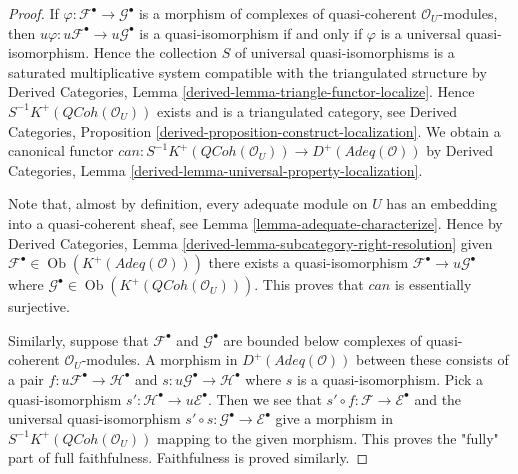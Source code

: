 \documentclass{stacks-project}
\theoremstyle{plain}
\theoremstyle{definition}
\theoremstyle{remark}
\numberwithin{equation}{subsection}
\def\Ob{\mathop{\mathrm{Ob}}\nolimits}
\def\QCoh{\mathit{QCoh}}
\begin{document}
\begin{proof}
If $\varphi : \mathcal{F}^\bullet \to \mathcal{G}^\bullet$
is a morphism of complexes of quasi-coherent
$\mathcal{O}_U$-modules, then $u\varphi : u\mathcal{F}^\bullet \to
u\mathcal{G}^\bullet$ is a quasi-isomorphism if and only if $\varphi$ is
a universal quasi-isomorphism. Hence the collection $S$
of universal quasi-isomorphisms is a saturated multiplicative
system compatible with the triangulated structure by
Derived Categories, Lemma \ref{derived-lemma-triangle-functor-localize}.
Hence $S^{-1}K^+(\QCoh(\mathcal{O}_U))$ exists and is a
triangulated category, see
Derived Categories, Proposition
\ref{derived-proposition-construct-localization}.
We obtain a canonical functor
$can : S^{-1}K^+(\QCoh(\mathcal{O}_U)) \to
D^{+}(\textit{Adeq}(\mathcal{O}))$ by
Derived Categories, Lemma \ref{derived-lemma-universal-property-localization}.

\medskip\noindent
Note that, almost by definition, every adequate module on $U$ has an
embedding into a quasi-coherent sheaf, see
Lemma \ref{lemma-adequate-characterize}. Hence by
Derived Categories, Lemma \ref{derived-lemma-subcategory-right-resolution}
given $\mathcal{F}^\bullet \in \Ob(K^+(\textit{Adeq}(\mathcal{O})))$
there exists a quasi-isomorphism
$\mathcal{F}^\bullet \to u\mathcal{G}^\bullet$
where $\mathcal{G}^\bullet \in \Ob(K^+(\QCoh(\mathcal{O}_U)))$.
This proves that $can$ is essentially surjective.

\medskip\noindent
Similarly, suppose that $\mathcal{F}^\bullet$ and $\mathcal{G}^\bullet$
are bounded below complexes of quasi-coherent $\mathcal{O}_U$-modules.
A morphism in $D^+(\textit{Adeq}(\mathcal{O}))$ between these
consists of a pair $f : u\mathcal{F}^\bullet \to \mathcal{H}^\bullet$
and $s : u\mathcal{G}^\bullet \to \mathcal{H}^\bullet$ where $s$
is a quasi-isomorphism. Pick a quasi-isomorphism
$s' : \mathcal{H}^\bullet \to u\mathcal{E}^\bullet$. Then we see that
$s' \circ f : \mathcal{F} \to \mathcal{E}^\bullet$ and the
universal quasi-isomorphism
$s' \circ s : \mathcal{G}^\bullet \to \mathcal{E}^\bullet$ give
a morphism in $S^{-1}K^{+}(\QCoh(\mathcal{O}_U))$ mapping
to the given morphism. This proves the "fully" part of full faithfulness.
Faithfulness is proved similarly.
\end{proof}
\end{document}
